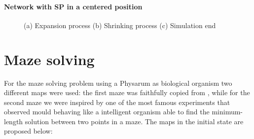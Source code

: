 \paragraph{Network with SP in a centered position}
\begin{figure}[H]
    \centering
    \caption{(a) Expansion process (b) Shrinking process (c) Simulation end}
    \label{fig:foobar}
\end{figure}

\section{Maze solving}
\label{maze_solving}

For the maze solving problem using a Physarum as biological organism two different maps were used: the first maze was faithfully copied from \cite{dourvas2016gpgpu}, while for the second maze we were inspired by one of the most famous experiments \cite{nakagaki2000intelligence} that observed mould behaving like a intelligent organism able to find the minimum-length solution between two points in a maze. The maps in the initial state are proposed below:

